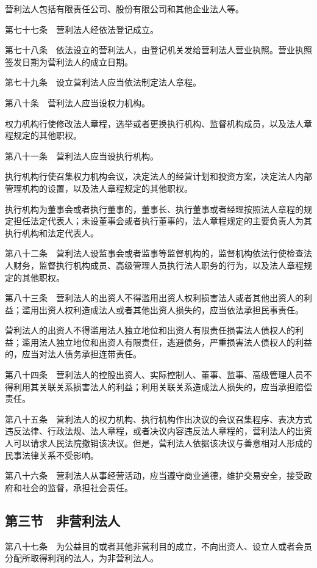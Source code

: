 \documentclass[UTF8,12pt,a4paper]{ctexbook}
\begin{document}
营利法人包括有限责任公司、股份有限公司和其他企业法人等。

第七十七条　营利法人经依法登记成立。

第七十八条　依法设立的营利法人，由登记机关发给营利法人营业执照。营业执照签发日期为营利法人的成立日期。

第七十九条　设立营利法人应当依法制定法人章程。

第八十条　营利法人应当设权力机构。

权力机构行使修改法人章程，选举或者更换执行机构、监督机构成员，以及法人章程规定的其他职权。

第八十一条　营利法人应当设执行机构。

执行机构行使召集权力机构会议，决定法人的经营计划和投资方案，决定法人内部管理机构的设置，以及法人章程规定的其他职权。

执行机构为董事会或者执行董事的，董事长、执行董事或者经理按照法人章程的规定担任法定代表人；未设董事会或者执行董事的，法人章程规定的主要负责人为其执行机构和法定代表人。

第八十二条　营利法人设监事会或者监事等监督机构的，监督机构依法行使检查法人财务，监督执行机构成员、高级管理人员执行法人职务的行为，以及法人章程规定的其他职权。

第八十三条　营利法人的出资人不得滥用出资人权利损害法人或者其他出资人的利益；滥用出资人权利造成法人或者其他出资人损失的，应当依法承担民事责任。

营利法人的出资人不得滥用法人独立地位和出资人有限责任损害法人债权人的利益；滥用法人独立地位和出资人有限责任，逃避债务，严重损害法人债权人的利益的，应当对法人债务承担连带责任。

第八十四条　营利法人的控股出资人、实际控制人、董事、监事、高级管理人员不得利用其关联关系损害法人的利益；利用关联关系造成法人损失的，应当承担赔偿责任。

第八十五条　营利法人的权力机构、执行机构作出决议的会议召集程序、表决方式违反法律、行政法规、法人章程，或者决议内容违反法人章程的，营利法人的出资人可以请求人民法院撤销该决议。但是，营利法人依据该决议与善意相对人形成的民事法律关系不受影响。

第八十六条　营利法人从事经营活动，应当遵守商业道德，维护交易安全，接受政府和社会的监督，承担社会责任。

\subsection*{第三节　非营利法人}

第八十七条　为公益目的或者其他非营利目的成立，不向出资人、设立人或者会员分配所取得利润的法人，为非营利法人。
\end{document}
